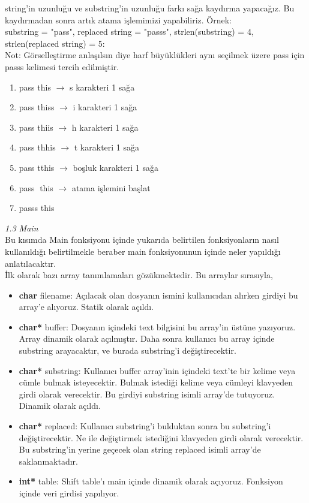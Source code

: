 \documentclass[11pt]{article}
\begin{document}
\begin{itemize}
\begin{enumerate}
    	string'in uzunluğu ve substring'in uzunluğu farkı sağa kaydırma 
    	yapacağız. Bu kaydırmadan sonra artık atama işlemimizi yapabiliriz.
    	Örnek: \\
    	substring = "pass", replaced string = "passs", strlen(substring) = 4,
    	strlen(replaced string) = 5:
    	\\ Not: Görselleştirme anlaşılsın diye harf büyüklükleri aynı 
    	seçilmek üzere pass için passs kelimesi tercih edilmiştir.
    	\begin{enumerate}
    		\item pass this $\rightarrow$ s karakteri 1 sağa 
    		\item pass thiss $\rightarrow$ i karakteri 1 sağa
    		\item pass thiis $\rightarrow$ h karakteri 1 sağa
    		\item pass thhis $\rightarrow$ t karakteri 1 sağa
    		\item pass tthis $\rightarrow$ boşluk karakteri 1 sağa
    		\item pass $\;$this $\rightarrow$ atama işlemini başlat
    		\item passs this
    	\end{enumerate}
    \end{enumerate}
\end{itemize}
\textit{\large{1.3 Main}}\\
\hspace*{1cm} Bu kısımda Main fonksiyonu içinde yukarıda belirtilen fonksiyonların nasıl kullanıldığı belirtilmekle beraber main fonksiyonunun içinde neler yapıldığı anlatılacaktır.\\
İlk olarak bazı array tanımlamaları gözükmektedir. Bu arraylar sırasıyla,
\begin{itemize}
	\item \textbf{char} \textsf{filename:} Açılacak olan dosyanın ismini
	kullanıcıdan alırken girdiyi bu array'e alıyoruz. Statik olarak açıldı.
	\item \textbf{char*} \textsf{buffer:} Dosyanın içindeki text bilgisini
	bu array'in üstüne yazıyoruz. Array dinamik olarak açılmıştır.
	Daha sonra kullanıcı bu array içinde substring arayacaktır, ve burada
	substring'i değiştirecektir.
	\item \textbf{char*} \textsf{substring:} Kullanıcı buffer array'inin 
	içindeki text'te bir kelime veya cümle bulmak isteyecektir. Bulmak 
	istediği kelime veya cümleyi klavyeden girdi olarak verecektir. 
	Bu girdiyi substring isimli array'de tutuyoruz. Dinamik olarak açıldı.
	\item \textbf{char*} \textsf{replaced:} Kullanıcı substring'i bulduktan
	sonra bu substring'i değiştirecektir. Ne ile değiştirmek istediğini
	klavyeden girdi olarak verecektir. Bu substring'in yerine geçecek olan
	string replaced isimli array'de saklanmaktadır.
	\item \textbf{int*} \textsf{table:} Shift table'ı main içinde dinamik
	olarak açıyoruz. Fonksiyon içinde veri girdisi yapılıyor.
\end{itemize}
\end{document}
